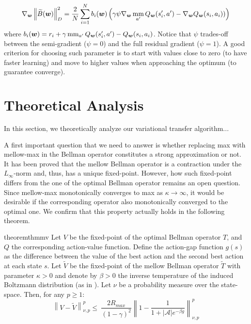 \documentclass{article}
\newcommand{\mm}{\operatornamewithlimits{mm}}
\newcommand{\wt}[1]{\widetilde{#1}}
\newcommand{\norm}[1]{\left\lVert #1 \right\rVert}
\newcommand{\abs}[1]{\left\lvert #1 \right\rvert}
\begin{document}
\begin{equation}
\nabla_{\bm{w}}\norm{\wt{B}(\bm{w})}_{D}^2 = \frac{2}{N}\sum_{i=1}^N b_i(\bm{w})\left( \gamma\psi\nabla_{\bm{w}}\mm_{a'}Q_{\bm{w}}(s_i',a') - \nabla_{\bm{w}}Q_{\bm{w}}(s_i,a_i)) \right)
\end{equation}
where $b_i(\bm{w}) = r_i + \gamma\mm_{a'}Q_{\bm{w}}(s_i',a') - Q_{\bm{w}}(s_i,a_i)$. Notice that $\psi$ trades-off between the semi-gradient ($\psi = 0$) and the full residual gradient ($\psi = 1$). A good criterion for choosing such parameter is to start with values close to zero (to have faster learning) and move to higher values when approaching the optimum (to guarantee converge).

\section{Theoretical Analysis}\label{sec:theory}

In this section, we theoretically analyze our variational transfer algorithm...

A first important question that we need to answer is whether replacing max with mellow-max in the Bellman operator constitutes a strong approximation or not. It has been proved \cite{}  that the mellow Bellman operator is a contraction under the $L_{\infty}$-norm and, thus, has a unique fixed-point.  However, how such fixed-point differs from the one of the optimal Bellman operator remains an open question. Since mellow-max monotonically converges to max as $\kappa \rightarrow \infty$, it would be desirable if the corresponding operator also monotonically converged to the optimal one. We confirm that this property actually holds in the following theorem.

\begin{restatable}{theorem}{thmmv} \label{th:mmv}
Let $V$ be the fixed-point of the optimal Bellman operator $T$, and $Q$ the corresponding action-value function. Define the action-gap function $g(s)$ as the difference between the value of the best action and the second best action at each state $s$. Let $\wt{V}$ be the fixed-point of the mellow Bellman operator $\wt{T}$ with parameter $\kappa > 0$ and denote by $\beta > 0$ the inverse temperature of the induced Boltzmann distribution (as in \cite{asadi2017alternative}). Let $\nu$ be a probability measure over the state-space. Then, for any $p \geq 1$:
\begin{equation}
\norm{V-\wt{V}}_{\nu,p}^p \leq\ \frac{2R_{max}}{(1-\gamma)^2}\norm{1 - \frac{1}{1 + \abs{\mathcal{A}}e^{-\beta g}}}_{\nu,p}^p
\end{equation}
\end{restatable}
\end{document}
